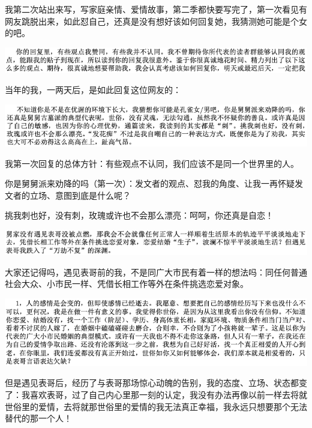 \documentclass[9pt, b5paper]{article}
\begin{document}
我第二次站出来写，写家庭亲情、爱情故事，第二季都快要写完了，第一次看见有网友跳脱出来，如此怼自己，还真是没有想好该如何回复她，我猜测她可能是个女的吧。 

\begin{center}
\includegraphics[width=.9\linewidth]{./pic/p1p114.png}
\end{center}

当年的我，一两天后，是如此回复这位网友的：

\begin{center}
\includegraphics[width=.9\linewidth]{./pic/p1p114-1.png}
\end{center}

我第一次回复的总体方针：有些观点不认同，我们应该不是同一个世界里的人。

你是舅舅派来劝降的吗（第一次）：发文者的观点、怼我的角度、让我一再怀疑发文者的立场、意图到底是什么呢？

挑我刺也好，没有刺，玫瑰或许也不会那么漂亮：呵呵，你还真是自恋！

\begin{center}
\includegraphics[width=.9\linewidth]{./pic/p1p70.png}
\end{center}

大家还记得吗，遇见表哥前的我，不是同广大市民有着一样的想法吗：同任何普通社会大众、小市民一样、凭借长相工作等外在条件挑选恋爱对象。

\begin{center}
\includegraphics[width=.9\linewidth]{./pic/p1p114-2.png}
\end{center}

但是遇见表哥后，经历了与表哥那场惊心动魄的告别，我的态度、立场、状态都变了：我喜欢表哥，过了自己内心里那一刻的认定，我没有办法再像以前一样去将就世俗里的爱情，去将就那世俗里的爱情的我无法真正幸福，我永远只想要那个无法替代的那一个人！
\end{document}
